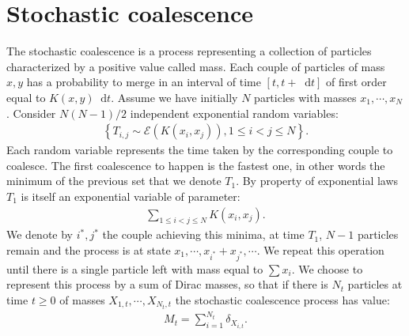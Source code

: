 \documentclass[11pt,a4paper]{article}
\newcommand{\dd}{\mathop{}\!\mathrm{d}}
\begin{document}
\section{Stochastic coalescence}
The stochastic coalescence is a process representing a collection of particles characterized by a positive value called mass. Each couple of particles of mass $x,y$ has a probability to merge in an interval of time $[t, t + \dd t]$ of first order equal to $K(x,y)\dd t$. Assume we have initially $N$ particles with masses $x_{1},\cdots,x_{N}$. Consider $N(N-1)/2$ independent exponential random variables:
\begin{align*}
    \left\lbrace T_{i,j} \sim \mathcal{E}\left(K(x_{i},x_{j})\right), 1 \leq i < j \leq N \right\rbrace.
\end{align*}
Each random variable represents the time taken by the corresponding couple to coalesce. The first coalescence to happen is the fastest one, in other words the minimum of the previous set that we denote $T_1$. By property of exponential laws $T_1$ is itself an exponential variable of parameter:
\begin{align*}
    \sum\limits_{1 \leq i < j \leq N}K(x_{i},x_{j}).
\end{align*}
We denote by $i^*,j^*$ the couple achieving this minima, at time $T_1$, $N-1$ particles remain and the process is at state $x_{1},\cdots , x_{i^*}+x_{j^*},\cdots$. We repeat this operation until there is a single particle left with mass equal to $\sum\limits x_i$. We choose to represent this process by a sum of Dirac masses, so that if there is $N_t$ particles at time $t\geq 0$ of masses $X_{1,t},\cdots,X_{N_t,t}$ the stochastic coalescence process has value:
\begin{align*}
    M_t = \sum\limits_{i = 1}^{N_t} \delta_{X_{i,t}}.
\end{align*}
\end{document}
